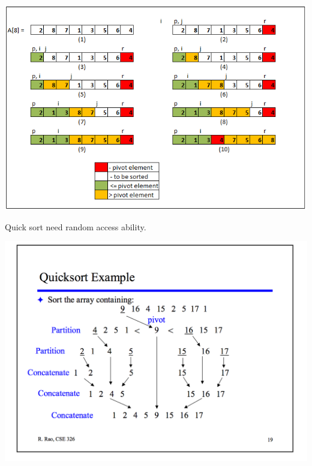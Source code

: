 \documentclass[a4paper,11pt,twoside]{book}
\begin{document}
\begin{center}
	\includegraphics[scale=0.45]{pics/qsort2.png}
\end{center}



\par Quick sort need random access ability.  

\begin{center}
	\includegraphics[scale=0.45]{pics/quick_sort.png} 
\end{center}
\end{document}
